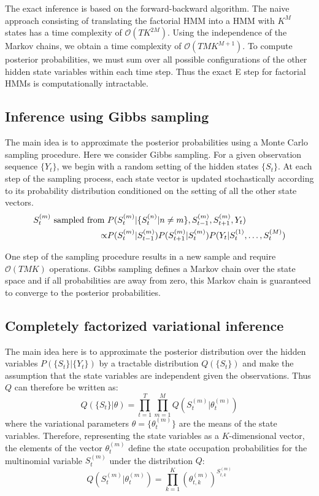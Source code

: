 \documentclass{article}
\begin{document}
The exact inference is based on the forward-backward algorithm. The naive approach consisting of translating the factorial HMM into a HMM with $K^M$ states has a time complexity of $\mathcal{O}(T K^{2M})$. Using the independence of the Markov chains, we obtain a time complexity of $\mathcal{O}(T M K^{M+1})$. To compute posterior probabilities, we must sum over all possible configurations of the other hidden state variables within each time step. Thus the exact E step for factorial HMMs is computationally intractable.

\subsection{Inference using Gibbs sampling}

The main idea is to approximate the posterior probabilities using a Monte Carlo sampling procedure. Here we consider Gibbs sampling. For a given observation sequence $\{Y_t\}$, we begin with a random setting of the hidden states $\{S_t\}$. At each step of the sampling process, each state vector is updated stochastically according to its probability distribution conditioned on the setting of all the other state vectors.
\begin{align*}
S_t^{(m)} \textnormal{ sampled from } & P(S_t^{(m)} | \{S_t^{(n)} | n \ne m \}, S_{t-1}^{(m)}, S_{t+1}^{(m)}, Y_t) \\
\propto & P(S_t^{(m)} | S_{t-1}^{(m)}) P(S_{t+1}^{(m)} | S_{t}^{(m)}) P(Y_t | S_{t}^{(1)}, \dots, S_{t}^{(M)})
\end{align*}

One step of the sampling procedure results in a new sample and require $\mathcal{O}(TMK)$ operations. Gibbs sampling defines a Markov chain over the state space and if all probabilities are away from zero, this Markov chain is guaranteed to converge to the posterior probabilities.

\subsection{Completely factorized variational inference}

The main idea here is to approximate the posterior distribution over the hidden variables $P(\{S_t\}|\{Y_t\})$ by a tractable distribution $Q(\{S_t\})$ and make the assumption that the state variables are independent given the observations. Thus $Q$ can therefore be written as:
\[ Q(\{S_t\}|\theta) = \prod_{t=1}^T \prod_{m=1}^M Q(S_t^{(m)}|\theta_t^{(m)}) \]
where the variational parameters $\theta = \{ \theta_t^{(m)} \}$ are the means of the state variables. Therefore, representing the state variables as a $K$-dimensional vector, the elements of the vector $\theta_t^{(m)}$ define the state occupation probabilities for the multinomial variable $S_t^{(m)}$ under the distribution $Q$:
\[ Q(S_t^{(m)}|\theta_t^{(m)}) = \prod_{k=1}^K \left( \theta_{t,k}^{(m)} \right)^{S_{t,k}^{(m)}} \]
\end{document}
